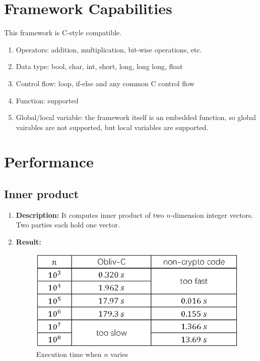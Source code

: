 \documentclass{article}
\begin{document}
\begin{spacing}{1.1}
\section{Framework Capabilities}

This framework is C-style compatible.

\begin{enumerate}

\item Operators: addition, multiplication, bit-wise operations, etc.

\item Data type: bool, char, int, short, long, long long, float

\item Control flow: loop, if-else and any common C control flow

\item Function: supported

\item Global/local variable: the framework itself is an embedded function, so
global vairables are not supported, but local variables are supported.

\end{enumerate}


\section{Performance}

\subsection{Inner product}

\begin{enumerate}

\item \textbf{Description:} It computes inner product of two $n$-dimension integer vectors.
Two parties each hold one vector.

\item \textbf{Result:}

\begin{figure}[H] 
\centering 
\includegraphics[scale=1]{dot.eps}
\caption{Execution time when $n$ varies}
\label{dot}
\end{figure}


\end{enumerate}
\end{spacing}
\end{document}
